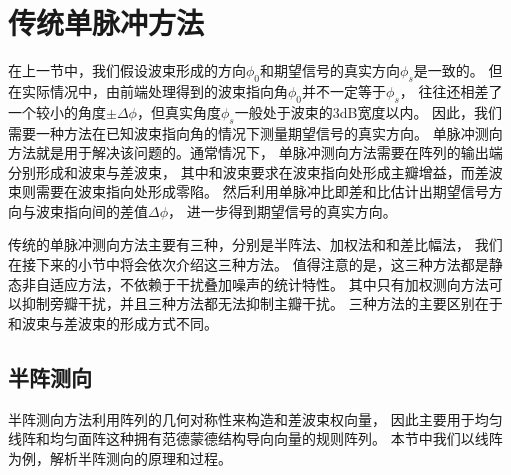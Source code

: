\documentclass[master]{thesis-uestc}
\begin{document}

\section{传统单脉冲方法}
在上一节中，我们假设波束形成的方向$\phi_0$和期望信号的真实方向$\phi_s$是一致的。
但在实际情况中，由前端处理得到的波束指向角$\phi_0$并不一定等于$\phi_s$，
往往还相差了一个较小的角度$\pm\Delta\phi$，但真实角度$\phi_s$一般处于波束的$3$dB宽度以内。
因此，我们需要一种方法在已知波束指向角的情况下测量期望信号的真实方向。
单脉冲测向方法就是用于解决该问题的。通常情况下，
单脉冲测向方法需要在阵列的输出端分别形成和波束与差波束，
其中和波束要求在波束指向处形成主瓣增益，而差波束则需要在波束指向处形成零陷。
然后利用单脉冲比即差和比估计出期望信号方向与波束指向间的差值$\Delta\phi$，
进一步得到期望信号的真实方向。

传统的单脉冲测向方法主要有三种，分别是半阵法、加权法和和差比幅法，
我们在接下来的小节中将会依次介绍这三种方法。
值得注意的是，这三种方法都是静态非自适应方法，不依赖于干扰叠加噪声的统计特性。
其中只有加权测向方法可以抑制旁瓣干扰，并且三种方法都无法抑制主瓣干扰。
三种方法的主要区别在于和波束与差波束的形成方式不同。

\subsection{半阵测向}
半阵测向方法利用阵列的几何对称性来构造和差波束权向量，
因此主要用于均匀线阵和均匀面阵这种拥有范德蒙德结构导向向量的规则阵列。
本节中我们以线阵为例，解析半阵测向的原理和过程。
\end{document}
